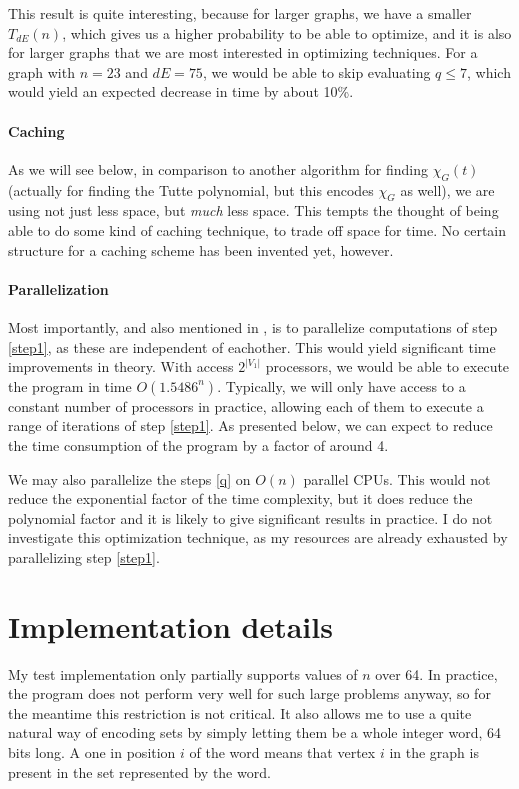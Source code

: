 \documentclass[a4paper]{article}
\begin{document}
This result is quite interesting, because for larger graphs, we have a smaller $T_{dE}(n)$, which gives us a higher probability to be able to optimize, and it is also for larger graphs that we are most interested in optimizing techniques. For a graph with $n=23$ and $dE = 75$, we would be able to skip evaluating $q\leq7$, which would yield an expected decrease in time by about 10\%\footnotemark. %


\paragraph{Caching} As we will see below, in comparison to another algorithm for finding $\chi_G(t)$ (actually for finding the Tutte polynomial, but this encodes $\chi_G$ as well), we are using not just less space, but \emph{much} less space. This tempts the thought of being able to do some kind of caching technique, to trade off space for time. No certain structure for a caching scheme has been invented yet, however.

\paragraph{Parallelization} Most importantly, and also mentioned in \cite{cov_pack}, is to parallelize computations of step \ref{step1}, as these are independent of eachother. This would yield significant time improvements in theory. With access $2^{|V_1|}$ processors, we would be able to execute the program in time $O(1.5486^n)$. Typically, we will only have access to a constant number of processors in practice, allowing each of them to execute a range of iterations of step \ref{step1}. As presented below, we can expect to reduce the time consumption of the program by a factor of around 4. %

We may also parallelize the steps \ref{q} on $O(n)$ parallel CPUs. This would not reduce the exponential factor of the time complexity, but it does reduce the polynomial factor and it is likely to give significant results in practice. I do not investigate this optimization technique, as my resources are already exhausted by parallelizing step \ref{step1}.

\section{Implementation details}
My test implementation only partially supports values of $n$ over 64. In practice, the program does not perform very well for such large problems anyway, so for the meantime this restriction is not critical. It also allows me to use a quite natural way of encoding sets by simply letting them be a whole integer word, 64 bits long. A one in position $i$ of the word means that vertex $i$ in the graph is present in the set represented by the word.
\end{document}
